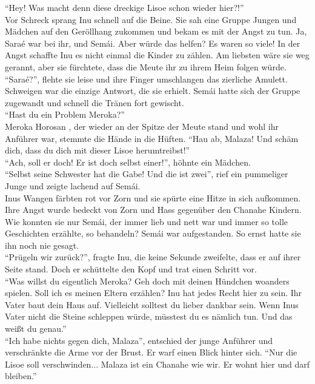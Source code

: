 ``Hey! Was macht denn diese dreckige Lisoe schon wieder hier?!'' \\
Vor Schreck sprang Inu schnell auf die Beine. Sie sah eine Gruppe Jungen und Mädchen auf den 
Geröllhang zukommen und bekam es mit der Angst zu tun. Ja, Saraé war bei ihr, und Semái. Aber würde 
das helfen? Es waren so viele! In der Angst schaffte Inu es nicht einmal die Kinder zu zählen. Am 
liebsten wäre sie weg gerannt, aber sie fürchtete, dass die Meute ihr zu ihrem Heim folgen würde. \\
``Saraé?'', flehte sie leise und ihre Finger umschlangen das zierliche Amulett. Schweigen war die 
einzige Antwort, die sie erhielt. Semái hatte sich der Gruppe zugewandt und schnell die Tränen fort 
gewischt. \\
``Hast du ein Problem Meroka?''\\
Meroka Horosan , der wieder an der Spitze der Meute stand und wohl ihr Anführer war, stemmte die 
Hände in die Hüften. ``Hau ab, Malaza! Und schäm dich, dass du dich mit dieser Lisoe 
herumtreibst!''\\
``Ach, soll er doch! Er ist doch selbst einer!'', höhnte ein Mädchen. \\
``Selbst seine Schwester hat die Gabe! Und die ist zwei'', rief ein pummeliger Junge und zeigte 
lachend auf Semái.\\
Inus Wangen färbten rot vor Zorn und sie spürte eine Hitze in sich aufkommen. Ihre Angst wurde 
bedeckt von Zorn und Hass gegenüber den Chanahe Kindern. Wie konnten sie nur Semái, der immer lieb 
und nett war und immer so tolle Geschichten erzählte, so behandeln? Semái war aufgestanden. So 
ernst hatte sie ihn noch nie gesagt.\\
``Prügeln wir zurück?'', fragte Inu, die keine Sekunde zweifelte, dass er auf ihrer Seite stand.
Doch er schüttelte den Kopf und trat einen Schritt vor.\\
``Was willst du eigentlich Meroka? Geh doch mit deinen Hündchen woanders spielen. Soll ich es 
meinen Eltern erzählen? Inu hat jedes Recht hier zu sein. Ihr Vater baut dein Haus auf. Vielleicht 
solltest du lieber dankbar sein. Wenn Inus Vater nicht die Steine schleppen würde, müsstest du es 
nämlich tun. Und das weißt du genau.''\\
``Ich habe nichts gegen dich, Malaza'', entschied der junge Anführer und verschränkte die Arme vor 
der Brust. Er warf einen Blick hinter sich. ``Nur die Lisoe soll verschwinden... Malaza ist ein 
Chanahe wie wir. Er wohnt hier und darf bleiben.''\\
